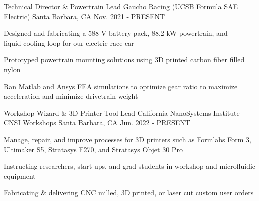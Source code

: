 

\begin{cventries}
\cventry
{Technical Director \& Powertrain Lead} %
{Gaucho Racing (UCSB Formula SAE Electric)} %
{Santa Barbara, CA} %
{Nov. 2021 - PRESENT} %
{ %
\begin{cvitems}   
\item {Designed and fabricating a 588 V battery pack, 88.2 kW powertrain, and \\ liquid cooling loop for our electric race car}
\item {Prototyped powertrain mounting solutions using 3D printed carbon fiber filled nylon}
\item {Ran Matlab and Ansys FEA simulations to optimize gear ratio to maximize acceleration and minimize drivetrain weight}
\end{cvitems}
}


\cventry
{Workshop Wizard \& 3D Printer Tool Lead} %
{California NanoSystems Institute - CNSI Workshops} %
{Santa Barbara, CA} %
{Jun. 2022 - PRESENT} %
{ %
\begin{cvitems}
\item {Manage, repair, and improve processes for 3D printers such as Formlabs Form 3, Ultimaker S5, Stratasys F270, and Stratasys Objet 30 Pro}
\item {Instructing researchers, start-ups, and grad students in workshop and microfluidic equipment}
\item {Fabricating \& delivering CNC milled, 3D printed, or laser cut custom user orders }
\end{cvitems}
}





\end{cventries}
